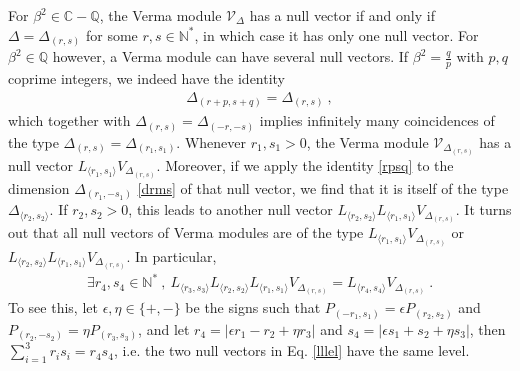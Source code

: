 \documentclass[12pt, a4paper]{article}
\theoremstyle{break}
\begin{document}
For $\beta^2\in\mathbb{C}-\mathbb{Q}$, the Verma module $\mathcal{V}_\Delta$ has a null vector if and only if $\Delta=\Delta_{(r, s)}$ for some $r,s\in\mathbb{N}^*$, in which case it has only one null vector. For $\beta^2\in\mathbb{Q}$ however, a Verma module can have several null vectors. If $\beta^2 = \frac{q}{p}$ with $p,q$ coprime integers, we indeed have the identity
\begin{align}
 \Delta_{(r+p,s+q)} = \Delta_{(r,s)}\ ,
 \label{rpsq}
\end{align}
which together with $\Delta_{(r,s)}=\Delta_{(-r,-s)}$ implies infinitely many coincidences of the type $\Delta_{(r,s)}=\Delta_{(r_1,s_1)}$. 
Whenever $r_1,s_1>0$, the Verma module $\mathcal{V}_{\Delta_{(r,s)}}$ has a null vector $L_{\langle r_1,s_1\rangle} V_{\Delta_{(r,s)}}$. 
Moreover, if we apply the identity \eqref{rpsq} to the dimension $\Delta_{(r_1,-s_1)}$ \eqref{drms} of that null vector, we find that it is itself of the type $\Delta_{\langle r_2,s_2\rangle}$. If $r_2,s_2>0$, this leads to another null vector $L_{\langle r_2,s_2\rangle}L_{\langle r_1,s_1\rangle} V_{\Delta_{(r,s)}}$. It turns out that all null vectors of Verma modules are of the type $L_{\langle r_1,s_1\rangle} V_{\Delta_{(r,s)}}$ or $L_{\langle r_2,s_2\rangle}L_{\langle r_1,s_1\rangle} V_{\Delta_{(r,s)}}$. In particular,
\begin{align}
 \exists r_4,s_4\in \mathbb{N}^*\ , \ L_{\langle r_3,s_3\rangle}L_{\langle r_2,s_2\rangle}L_{\langle r_1,s_1\rangle} V_{\Delta_{(r,s)}} = L_{\langle r_4,s_4\rangle} V_{\Delta_{(r,s)}}\ .
 \label{lllel}
\end{align}
To see this, let $\epsilon,\eta\in\{+,-\}$ be the signs such that $P_{(-r_1,s_1)}=\epsilon P_{(r_2,s_2)}$ and $P_{(r_2,-s_2)}=\eta P_{(r_3,s_3)}$, and let $r_4=|\epsilon r_1-r_2+\eta r_3|$ and $s_4=|\epsilon s_1+s_2+\eta s_3|$, then $\sum_{i=1}^3 r_is_i=r_4s_4$, i.e. the two null vectors in Eq. \eqref{lllel} have the same level. 
\end{document}
